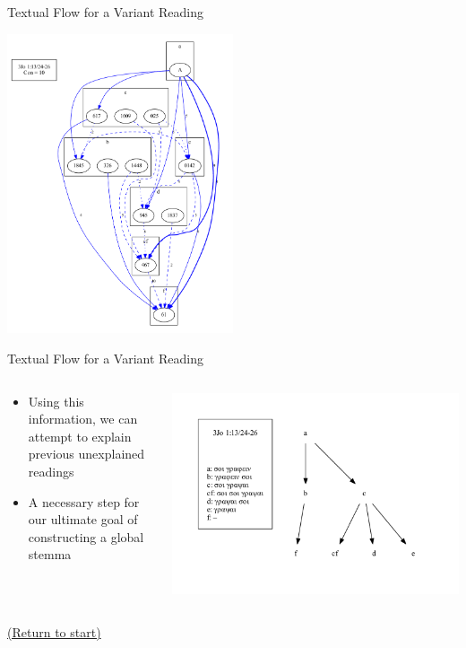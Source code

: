 \documentclass[10pt]{beamer}
\begin{document}
	\begin{frame}{Textual Flow for a Variant Reading}
		\begin{center}
			\includegraphics[width=0.5\textwidth]{../graphics/B25K1V13U24-26-coherence-variants-strengths.pdf}
		\end{center}
	\end{frame}
	\begin{frame}{Textual Flow for a Variant Reading}
		\begin{columns}
			\begin{column}{0.45\textwidth}
				\begin{itemize}
					\item Using this information, we can attempt to explain previous unexplained readings
					\item A necessary step for our ultimate goal of constructing a global stemma
				\end{itemize}
			\end{column}
			\begin{column}{0.45\textwidth}
				\begin{center}
					\includegraphics[width=\textwidth]{../graphics/B25K1V13U24-26-local-stemma-complete.pdf}
				\end{center}
			\end{column}
		\end{columns}
		\begin{center}
			\hyperlink{slide:crossroad}{(Return to start)}
		\end{center}
	\end{frame}
\end{document}
